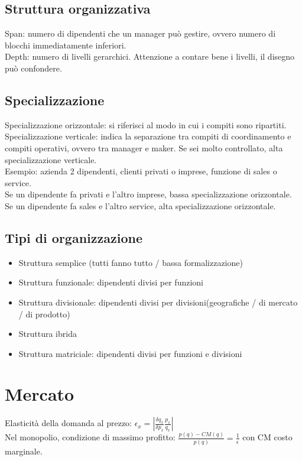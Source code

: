 \documentclass{scrreprt}
\begin{document}
\subsection*{Struttura organizzativa}
Span: numero di dipendenti che un manager può gestire, ovvero numero di blocchi immediatamente inferiori.\\
Depth: numero di livelli gerarchici. Attenzione a contare bene i livelli, il disegno può confondere.\\

\subsection*{Specializzazione}
Specializzazione orizzontale: si riferisci al modo in cui i compiti sono ripartiti.\\
Specializzazione verticale: indica la separazione tra compiti di coordinamento e compiti operativi, ovvero tra manager e maker. Se sei molto controllato, alta specializzazione verticale.\\

Esempio: azienda 2 dipendenti, clienti privati o imprese, funzione di sales o service.\\
Se un dipendente fa privati e l'altro imprese, bassa specializzazione orizzontale.\\
Se un dipendente fa sales e l'altro service, alta specializzazione orizzontale.\\

\subsection*{Tipi di organizzazione}
\begin{itemize}
	\item Struttura semplice (tutti fanno tutto / bassa formalizzazione)
	\item Struttura funzionale: dipendenti divisi per funzioni
	\item Struttura divisionale: dipendenti divisi per divisioni(geografiche / di mercato / di prodotto)
	\item Struttura ibrida
	\item Struttura matriciale: dipendenti divisi per funzioni e divisioni
\end{itemize}

\section*{Mercato}
Elasticità della domanda al prezzo: $\epsilon_x = \left\lvert \frac{\delta q_x}{\delta p_x} \frac{p_x}{q_x}\right\rvert$\\
Nel monopolio, condizione di massimo profitto: $\frac{p(q)-CM(q)}{p(q)} = \frac{1}{\epsilon}$ con CM costo marginale.
\end{document}
